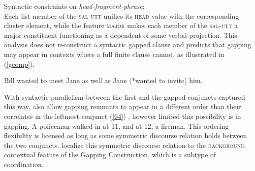 \ea
\label{gap-hf-con}
Syntactic constraints on \emph{head-fragment-phrase}:\\
 \impl
{}
\z
 Each list member of the \textsc{sal-utt} unifies 
its \textsc{head} value with the corresponding cluster element, while the feature \textsc{major} makes each member of the \textsc{sal-utt} a major constituent functioning as a dependent of some verbal projection. %
This analysis does not reconstruct a syntactic gapped clause and %
predicts that gapping may appear in contexts where a full finite clause cannot, as illustrated in (\ref{gcomp}).
 
 \ea 
 Bill wanted to meet Jane as well as Jane (*wanted to invite) him. \citep[242]{Abeille2014}\label{gcomp}
 \z
%

   With syntactic parallelism between the first and
   the gapped conjuncts captured this way, \citet{Abeille2014} also allow 
    gapping remnants to appear in a different order than their correlates in the leftmost conjunct (\ref{64}) \citep[see][156--158]{Sag1985}, however limited this possibility is in gapping.
%
\ea A policeman walked in at 11, and at 12, a fireman. \label{64}\z
%
%
This ordering flexibility is licensed as long as some symmetric discourse relation holds between the two conjuncts. \citet{Abeille2014} 
localize this symmetric discourse relation to the \textsc{background} contextual feature of the Gapping Construction, which is a subtype of coordination. 


